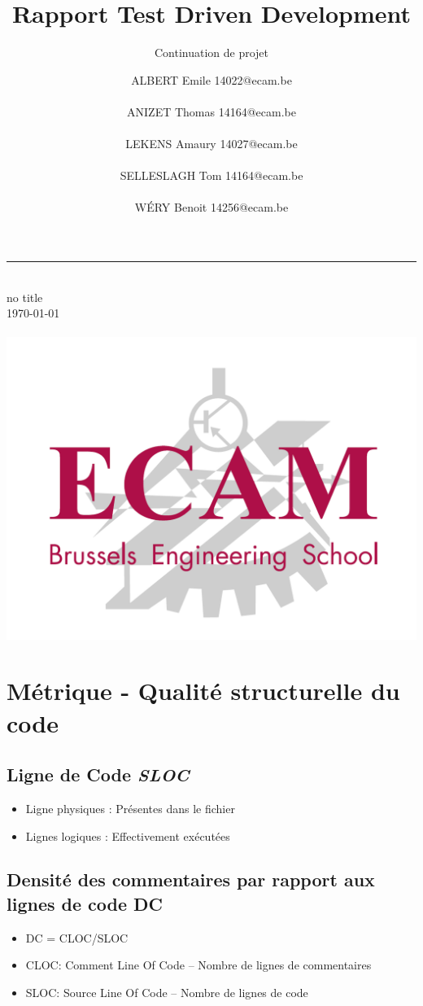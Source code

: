 \documentclass[10pt,a4paper]{article}
\title{Rapport Test Driven Development}
\subtitle{Continuation de projet}
\author{
ALBERT Emile 14022@ecam.be\\\\
ANIZET Thomas 14164@ecam.be\\\\
LEKENS Amaury 14027@ecam.be\\\\
SELLESLAGH Tom 14164@ecam.be\\\\
W\'ERY Benoit 14256@ecam.be
}
\makeatletter
\def\@subtitle{no title}
\makeatother
\begin{document}
\begin{titlepage} 
	\hspace{0.5cm}	
	\rule{1.5pt}{\textheight} 
	\hspace{1.5cm}		
	\parbox[b]{13cm}
	{  		
		{\huge \thetitle}\\[1\baselineskip]
		{\LARGE \@subtitle} \\[1\baselineskip]
		\today \\[3\baselineskip]
		
		{\Large \theauthor}\\[22\baselineskip]
		\hspace*{6cm}\includegraphics[scale=0.3]{logo_ECAM.png}
					
	}
\end{titlepage}

\section{Métrique - Qualité structurelle du code}
\subsection*{Ligne de Code \textit{SLOC}}  
\begin{itemize}
\item Ligne physiques  : Présentes dans le fichier  
\item Lignes logiques  : Effectivement exécutées  
\end{itemize}

\subsection*{Densité des commentaires par rapport aux lignes de code DC}
\begin{itemize}
\item DC = CLOC/SLOC   
\item CLOC: Comment Line Of Code –  Nombre de lignes de commentaires  
\item SLOC: Source Line Of Code –  Nombre de lignes de code   
\end{itemize}
\end{document}
